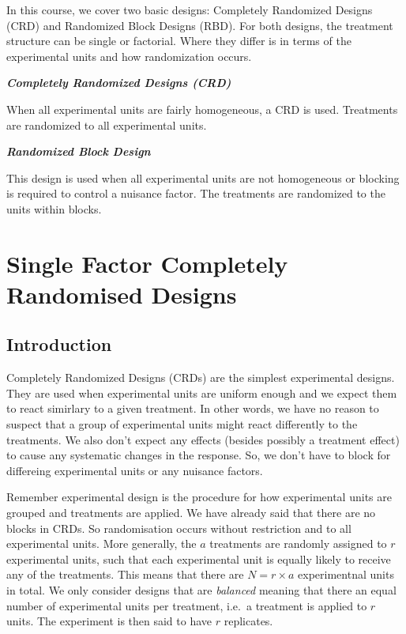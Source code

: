 \documentclass[
  letterpaper,
  DIV=11,
  numbers=noendperiod,
  oneside]{scrreprt}
\begin{document}
In this course, we cover two basic designs: Completely Randomized
Designs (CRD) and Randomized Block Designs (RBD). For both designs, the
treatment structure can be single or factorial. Where they differ is in
terms of the experimental units and how randomization occurs.

\textbf{\emph{Completely Randomized Designs (CRD)}}

When all experimental units are fairly homogeneous, a CRD is used.
Treatments are randomized to all experimental units.

\textbf{\emph{Randomized Block Design}}

This design is used when all experimental units are not homogeneous or
blocking is required to control a nuisance factor. The treatments are
randomized to the units within blocks.

\part{Single Factor Completely Randomised Designs}

\chapter{Introduction}\label{introduction}

Completely Randomized Designs (CRDs) are the simplest experimental
designs. They are used when experimental units are uniform enough and we
expect them to react simirlary to a given treatment. In other words, we
have no reason to suspect that a group of experimental units might react
differently to the treatments. We also don't expect any effects (besides
possibly a treatment effect) to cause any systematic changes in the
response. So, we don't have to block for differeing experimental units
or any nuisance factors.

Remember experimental design is the procedure for how experimental units
are grouped and treatments are applied. We have already said that there
are no blocks in CRDs. So randomisation occurs without restriction and
to all experimental units. More generally, the \(a\) treatments are
randomly assigned to \(r\) experimental units, such that each
experimental unit is equally likely to receive any of the treatments.
This means that there are \(N = r \times a\) experimentnal units in
total. We only consider designs that are \emph{balanced} meaning that
there an equal number of experimental units per treatment, i.e.~a
treatment is applied to \(r\) units. The experiment is then said to have
\(r\) replicates.
\end{document}

